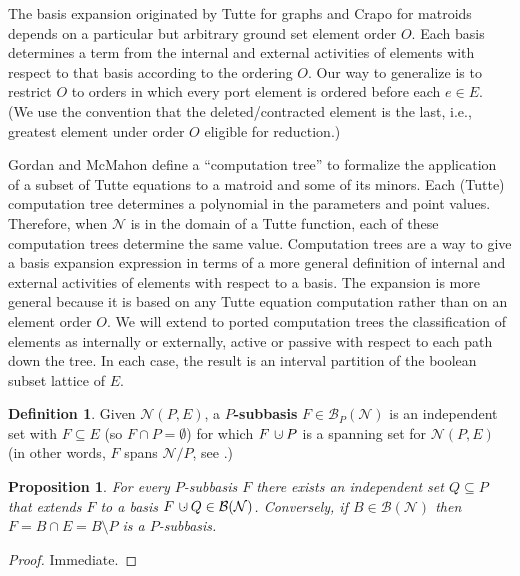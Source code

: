 \documentclass[12pt]{article}
\newtheorem{proposition}[theorem]{Proposition}
\theoremstyle{definition}
\newtheorem{definition}[theorem]{Definition}
\newcommand{\dunion}
{\mbox{\hbox{\hskip6pt$\cdot$\hskip-5.50pt$\cup$\hskip2pt}}}
\begin{document}
The basis expansion originated by Tutte\cite{TutteDich}
for graphs and Crapo\cite{CrapoAct} for matroids depends on 
a particular but arbitrary ground set element order $O$.
Each basis determines a term from the internal
and external activities of elements with respect to that basis
according to the ordering $O$.
Our way to generalize is to 
restrict $O$ to orders in which
every port element is ordered before 
each $e\in E$.  (We use the convention that the deleted/contracted element
is the last, i.e., greatest element under order $O$ eligible for reduction.)

Gordan and McMahon define\cite{GordonMcMachonGreedoid} 
a ``computation tree''
to formalize the application of a subset of Tutte equations
to a matroid and some of its minors.
Each (Tutte) computation
tree determines
a polynomial in the parameters and point values.
Therefore, when
$\mathcal{N}$ is in the domain of a Tutte function, each
of these computation trees determine the same value.  
Computation
trees are a way to give
a basis expansion expression in terms of 
a more 
general definition 
of internal and external activities of elements
with respect to a basis.  The expansion is more general because it
is based on any Tutte equation computation rather than on an element order $O$.
We will extend to ported computation trees the
classification\cite{GordonMcMachonGreedoid} of elements as internally or externally, 
active or passive
with respect to each path down the tree.
In each case, the result is an interval
partition of the boolean subset lattice of $E$.  

\begin{definition}
Given $\mathcal{N}(P,E)$,  a
\textbf{$P$-subbasis} $F\in \mathcal{B}_P(\mathcal{N})$
is an independent set  with $F\subseteq E$
(so $F\cap P=\emptyset$) for which $F\dunion P$ is a spanning set
for $\mathcal{N}(P,E)$ (in other words, $F$ spans $\mathcal{N}/P$,
see \cite{SetPointedLV}.)
\end{definition}

\begin{proposition}
For every $P$-subbasis $F$ there exists an independent set $Q\subseteq P$
that extends $F$ to a basis $F\dunion Q\in \mathcal{B}(\mathcal{N})$.
Conversely, if $B\in\mathcal{B}(\mathcal{N})$ then $F=B\cap E=B\setminus P$
is a $P$-subbasis.
\end{proposition}

\begin{proof} Immediate. \end{proof}
\end{document}
